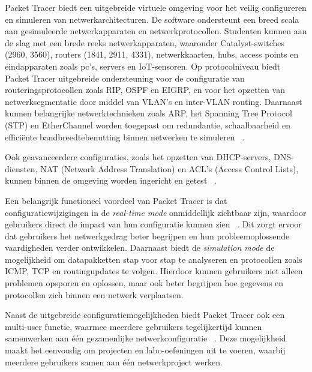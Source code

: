 Packet Tracer biedt een uitgebreide virtuele omgeving voor het veilig configureren en simuleren van netwerkarchitecturen. De software ondersteunt een breed scala aan gesimuleerde netwerkapparaten en netwerkprotocollen. Studenten kunnen aan de slag met een brede reeks netwerkapparaten, waaronder Catalyst-switches (2960, 3560), routers (1841, 2911, 4331), netwerkkaarten, hubs, access points en eindapparaten zoals pc’s, servers en IoT-sensoren. Op protocolniveau biedt Packet Tracer uitgebreide ondersteuning voor de configuratie van routeringsprotocollen zoals RIP, OSPF en EIGRP, en voor het opzetten van netwerksegmentatie door middel van VLAN’s en inter-VLAN routing. Daarnaast kunnen belangrijke netwerktechnieken zoals ARP, het Spanning Tree Protocol (STP) en EtherChannel worden toegepast om redundantie, schaalbaarheid en efficiënte bandbreedtebenutting binnen netwerken te simuleren ~\autocite{CiscoPacketTracerFAQ}.

\vspace{0.3cm}

Ook geavanceerdere configuraties, zoals het opzetten van DHCP-servers, DNS-diensten, NAT (Network Address Translation) en ACL’s (Access Control Lists), kunnen binnen de omgeving worden ingericht en getest ~\autocite{CiscoPacketTracerFAQ}.

\vspace{0.3cm}

Een belangrijk functioneel voordeel van Packet Tracer is dat configuratiewijzigingen in de \textit{real-time mode} onmiddellijk zichtbaar zijn, waardoor gebruikers direct de impact van hun configuratie kunnen zien ~\autocite{Kuzmenko2016}. Dit zorgt ervoor dat gebruikers het netwerkgedrag beter begrijpen en hun probleemoplossende vaardigheden verder ontwikkelen. Daarnaast biedt de \textit{simulation mode} de mogelijkheid om datapakketten stap voor stap te analyseren en protocollen zoals ICMP, TCP en routingupdates te volgen. Hierdoor kunnen gebruikers niet alleen problemen opsporen en oplossen, maar ook beter begrijpen hoe gegevens en protocollen zich binnen een netwerk verplaatsen.


\vspace{0.3cm}


Naast de uitgebreide configuratiemogelijkheden biedt Packet Tracer ook een multi-user functie, waarmee meerdere gebruikers tegelijkertijd kunnen samenwerken aan één gezamenlijke netwerkconfiguratie ~\autocite{Smith2010}. Deze mogelijkheid maakt het eenvoudig om projecten en labo-oefeningen uit te voeren, waarbij meerdere gebruikers samen aan één netwerkproject werken.

